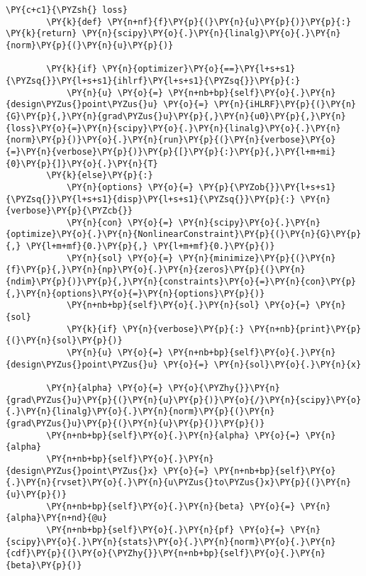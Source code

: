 \begin{tcolorbox}[breakable, size=fbox, boxrule=1pt, pad at break*=1mm,colback=cellbackground, colframe=cellborder]
\begin{Verbatim}[commandchars=\\\{\}]
        \PY{c+c1}{\PYZsh{} loss}
        \PY{k}{def} \PY{n+nf}{f}\PY{p}{(}\PY{n}{u}\PY{p}{)}\PY{p}{:} \PY{k}{return} \PY{n}{scipy}\PY{o}{.}\PY{n}{linalg}\PY{o}{.}\PY{n}{norm}\PY{p}{(}\PY{n}{u}\PY{p}{)}

        \PY{k}{if} \PY{n}{optimizer}\PY{o}{==}\PY{l+s+s1}{\PYZsq{}}\PY{l+s+s1}{ihlrf}\PY{l+s+s1}{\PYZsq{}}\PY{p}{:}
            \PY{n}{u} \PY{o}{=} \PY{n+nb+bp}{self}\PY{o}{.}\PY{n}{design\PYZus{}point\PYZus{}u} \PY{o}{=} \PY{n}{iHLRF}\PY{p}{(}\PY{n}{G}\PY{p}{,}\PY{n}{grad\PYZus{}u}\PY{p}{,}\PY{n}{u0}\PY{p}{,}\PY{n}{loss}\PY{o}{=}\PY{n}{scipy}\PY{o}{.}\PY{n}{linalg}\PY{o}{.}\PY{n}{norm}\PY{p}{)}\PY{o}{.}\PY{n}{run}\PY{p}{(}\PY{n}{verbose}\PY{o}{=}\PY{n}{verbose}\PY{p}{)}\PY{p}{[}\PY{p}{:}\PY{p}{,}\PY{l+m+mi}{0}\PY{p}{]}\PY{o}{.}\PY{n}{T}
        \PY{k}{else}\PY{p}{:}
            \PY{n}{options} \PY{o}{=} \PY{p}{\PYZob{}}\PY{l+s+s1}{\PYZsq{}}\PY{l+s+s1}{disp}\PY{l+s+s1}{\PYZsq{}}\PY{p}{:} \PY{n}{verbose}\PY{p}{\PYZcb{}}
            \PY{n}{con} \PY{o}{=} \PY{n}{scipy}\PY{o}{.}\PY{n}{optimize}\PY{o}{.}\PY{n}{NonlinearConstraint}\PY{p}{(}\PY{n}{G}\PY{p}{,} \PY{l+m+mf}{0.}\PY{p}{,} \PY{l+m+mf}{0.}\PY{p}{)}
            \PY{n}{sol} \PY{o}{=} \PY{n}{minimize}\PY{p}{(}\PY{n}{f}\PY{p}{,}\PY{n}{np}\PY{o}{.}\PY{n}{zeros}\PY{p}{(}\PY{n}{ndim}\PY{p}{)}\PY{p}{,}\PY{n}{constraints}\PY{o}{=}\PY{n}{con}\PY{p}{,}\PY{n}{options}\PY{o}{=}\PY{n}{options}\PY{p}{)}
            \PY{n+nb+bp}{self}\PY{o}{.}\PY{n}{sol} \PY{o}{=} \PY{n}{sol}
            \PY{k}{if} \PY{n}{verbose}\PY{p}{:} \PY{n+nb}{print}\PY{p}{(}\PY{n}{sol}\PY{p}{)}
            \PY{n}{u} \PY{o}{=} \PY{n+nb+bp}{self}\PY{o}{.}\PY{n}{design\PYZus{}point\PYZus{}u} \PY{o}{=} \PY{n}{sol}\PY{o}{.}\PY{n}{x}

        \PY{n}{alpha} \PY{o}{=} \PY{o}{\PYZhy{}}\PY{n}{grad\PYZus{}u}\PY{p}{(}\PY{n}{u}\PY{p}{)}\PY{o}{/}\PY{n}{scipy}\PY{o}{.}\PY{n}{linalg}\PY{o}{.}\PY{n}{norm}\PY{p}{(}\PY{n}{grad\PYZus{}u}\PY{p}{(}\PY{n}{u}\PY{p}{)}\PY{p}{)}
        \PY{n+nb+bp}{self}\PY{o}{.}\PY{n}{alpha} \PY{o}{=} \PY{n}{alpha}
        \PY{n+nb+bp}{self}\PY{o}{.}\PY{n}{design\PYZus{}point\PYZus{}x} \PY{o}{=} \PY{n+nb+bp}{self}\PY{o}{.}\PY{n}{rvset}\PY{o}{.}\PY{n}{u\PYZus{}to\PYZus{}x}\PY{p}{(}\PY{n}{u}\PY{p}{)}
        \PY{n+nb+bp}{self}\PY{o}{.}\PY{n}{beta} \PY{o}{=} \PY{n}{alpha}\PY{n+nd}{@u}
        \PY{n+nb+bp}{self}\PY{o}{.}\PY{n}{pf} \PY{o}{=} \PY{n}{scipy}\PY{o}{.}\PY{n}{stats}\PY{o}{.}\PY{n}{norm}\PY{o}{.}\PY{n}{cdf}\PY{p}{(}\PY{o}{\PYZhy{}}\PY{n+nb+bp}{self}\PY{o}{.}\PY{n}{beta}\PY{p}{)}


\end{Verbatim}
\end{tcolorbox}
